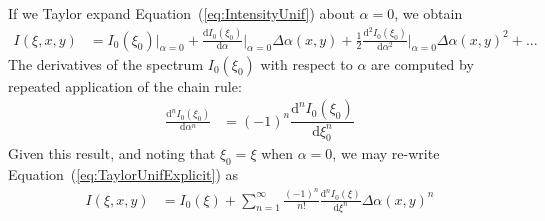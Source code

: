 \documentclass[modern]{aastex62}
\begin{document}
If we Taylor expand Equation~(\ref{eq:IntensityUnif}) about $\alpha = 0$, we obtain
%
\begin{align}
    \label{eq:TaylorUnifExplicit}
    I(\xi, x, y) 
        &=
        I_0(\xi_0) \Bigg|_{\alpha=0}
        + 
        \frac{\mathrm{d}I_0(\xi_0)}{\mathrm{d}\alpha} \Bigg|_{\alpha=0} \Delta\alpha(x, y)
        + 
        \frac{1}{2}\frac{\mathrm{d}^2I_0(\xi_0)}{\mathrm{d}\alpha^2} \Bigg|_{\alpha=0} \Delta\alpha(x, y)^2
        +
        ... 
\end{align}
%
The derivatives of the spectrum $I_0(\xi_0)$ with respect to
$\alpha$ are computed by repeated application of the chain rule:
%
\begin{align}
    \frac{\mathrm{d}^nI_0(\xi_0)}{\mathrm{d}\alpha^n} &=
    (-1)^n\dfrac{\mathrm{d}^nI_0(\xi_0)}{\mathrm{d}\xi_0^n}
\end{align}
%
Given this result, and noting that $\xi_0 = \xi$ when $\alpha = 0$,
we may re-write Equation~(\ref{eq:TaylorUnifExplicit}) as
%
\begin{align}
    \label{eq:TaylorUnifSum}
    I(\xi, x, y) 
        &=
        I_0(\xi)
        +
        \sum_{n=1}^\infty
            \frac{(-1)^n}{n!}
            \frac{\mathrm{d}^nI_0(\xi)}{\mathrm{d}\xi^n}
            \Delta\alpha(x, y)^n
\end{align}




\end{document}
